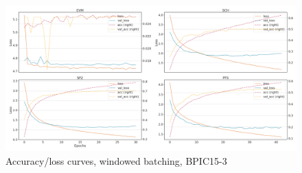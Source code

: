 \begin{figure}[!htb]
    \centering
    \includegraphics[width=\textwidth]{gfx/bpic2015_3/windowed_loss_acc_curve.png}
    \caption{Accuracy/loss curves, windowed batching, BPIC15-3}
\end{figure}
\FloatBarrier

